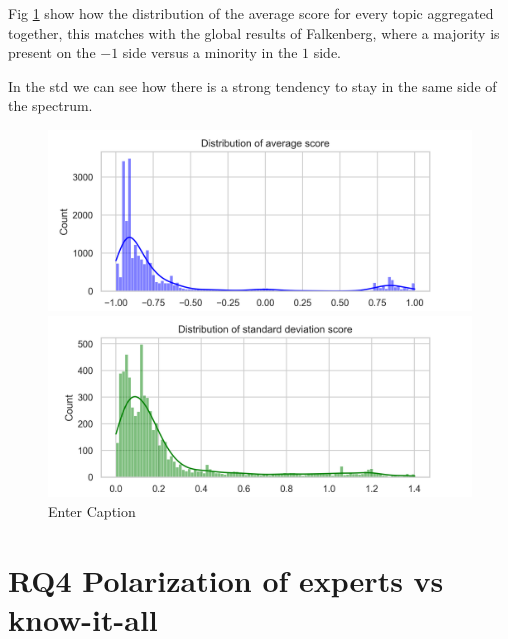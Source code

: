 Fig \ref{fig:std_avg} show how the distribution of the average score for every topic aggregated together, this matches with the global results of Falkenberg, where a majority is present on the $-1$ side versus a minority in the $1$ side.

In the std we can see how there is a strong tendency to stay in the same side of the spectrum.

\begin{figure}
    \centering
    \includegraphics[width=0.9\linewidth]{Chapter5//figures/avg_score.png}
    
    \includegraphics[width=0.9\linewidth]{Chapter5//figures/std_score.png}
    \caption{Enter Caption}
    \label{fig:std_avg}
\end{figure}



\section{RQ4 Polarization of experts vs know-it-all }
